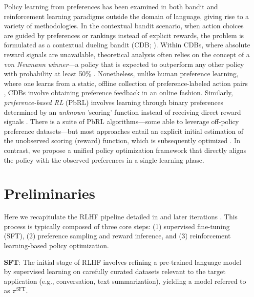 Policy learning from preferences has been examined in both bandit and reinforcement learning paradigms outside the domain of language, giving rise to a variety of methodologies. In the contextual bandit scenario, when action choices are guided by preferences or rankings instead of explicit rewards, the problem is formulated as a contextual dueling bandit (CDB; \cite{yue2012karmed,dudik2015contextual}). Within CDBs, where absolute reward signals are unavailable, theoretical analysis often relies on the concept of a \textit{von Neumann winner}—a policy that is expected to outperform any other policy with probability at least 50\% \citep{dudik2015contextual}. Nonetheless, unlike human preference learning, where one learns from a static, offline collection of preference-labeled action pairs \citep{yan2022human}, CDBs involve obtaining preference feedback in an online fashion. Similarly, \textit{preference-based RL} (PbRL) involves learning through binary preferences determined by an \textit{unknown} 'scoring' function instead of receiving direct reward signals \citep{BusaFekete2014,ruiz2023dueling}. There is a suite of PbRL algorithms—some able to leverage off-policy preference datasets—but most approaches entail an explicit initial estimation of the unobserved scoring (reward) function, which is subsequently optimized \citep{jain2013learning,BusaFekete2014,christiano2017deep,sadigh2017active,kupcsik2018learning}. In contrast, we propose a unified policy optimization framework that directly aligns the policy with the observed preferences in a single learning phase.

\section{Preliminaries}\label{section:prelims}

Here we recapitulate the RLHF pipeline detailed in \citeauthor{ziegler2020finetuning} and later iterations \citep{stiennon2022learning, bai2022training, ouyang2022training}. This process is typically composed of three core steps: (1) supervised fine-tuning (SFT), (2) preference sampling and reward inference, and (3) reinforcement learning-based policy optimization.

\textbf{SFT}: The initial stage of RLHF involves refining a pre-trained language model by supervised learning on carefully curated datasets relevant to the target application (e.g., conversation, text summarization), yielding a model referred to as $\pi^\text{SFT}$.

